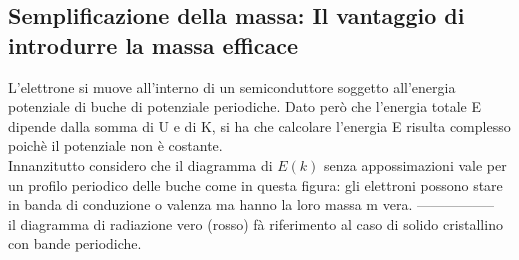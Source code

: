 \subsection{Semplificazione della massa: Il vantaggio di introdurre la massa efficace }
L'elettrone si muove all'interno di un semiconduttore soggetto all'energia potenziale di buche di potenziale periodiche. Dato però che l'energia totale E dipende dalla somma di U e di K, si ha che calcolare l'energia E risulta complesso poichè il potenziale non è costante.\\
Innanzitutto considero che il diagramma di $E(k)$ senza appossimazioni vale per un profilo periodico delle buche come in questa figura:
gli elettroni possono stare in banda di conduzione o valenza ma hanno la loro massa m vera.
-----------------\\
il diagramma di radiazione vero (rosso) fà riferimento al caso di solido cristallino con bande periodiche.  

